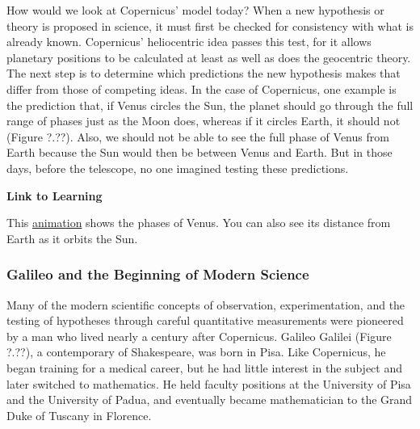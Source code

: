 \documentclass[main.tex]{subfiles}
\begin{document}
\vspace{1em}

How would we look at Copernicus' model today? When a new hypothesis or theory is proposed in science, it must first be checked for consistency with what is already known. Copernicus' heliocentric idea passes this test, for it allows planetary positions to be calculated at least as well as does the geocentric theory. The next step is to determine which predictions the new hypothesis makes that differ from those of competing ideas. In the case of Copernicus, one example is the prediction that, if Venus circles the Sun, the planet should go through the full range of phases just as the Moon does, whereas if it circles Earth, it should not (Figure ?.??). Also, we should not be able to see the full phase of Venus from Earth because the Sun would then be between Venus and Earth. But in those days, before the telescope, no one imagined testing these predictions.

\vspace{1em}


\begin{mdframed}[backgroundcolor=black!10]
    \textbf{Link to Learning}

    \vspace{1ex}

    This \href{https://openstax.org/l/30venusphases}{animation} shows the phases of Venus. You can also see its distance from Earth as it orbits the Sun.
\end{mdframed}

\subsubsection*{Galileo and the Beginning of Modern Science}

Many of the modern scientific concepts of observation, experimentation, and the testing of hypotheses through careful quantitative measurements were pioneered by a man who lived nearly a century after Copernicus. Galileo Galilei (Figure ?.??), a contemporary of Shakespeare, was born in Pisa. Like Copernicus, he began training for a medical career, but he had little interest in the subject and later switched to mathematics. He held faculty positions at the University of Pisa and the University of Padua, and eventually became mathematician to the Grand Duke of Tuscany in Florence.

\vspace{1em} %
\end{document}
